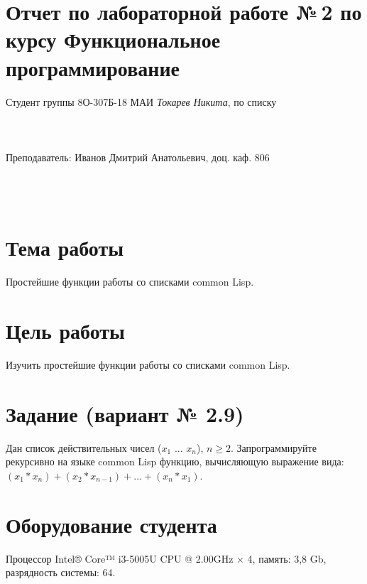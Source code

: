 \documentclass[12pt]{article}
\begin{document}
\section*{Отчет по лабораторной работе №\,2 
по курсу \guillemotleft  Функциональное программирование\guillemotright}
\begin{flushright}
Студент группы 8О-307Б-18 МАИ \textit{Токарев Никита},  по списку \\
 \\
 \\
\ \\
Преподаватель: Иванов Дмитрий Анатольевич, доц. каф. 806 \\
 \\
 \\
 \\

\end{flushright}

\section{Тема работы}
Простейшие функции работы со списками common Lisp.

\section{Цель работы}
Изучить  простейшие функции работы со списками common Lisp.

\section{Задание (вариант № 2.9)}
Дан список действительных чисел ($x_{1}$ ... $x_{n}$), \(n \geqslant 2\).
Запрограммируйте рекурсивно на языке common Lisp функцию, вычисляющую выражение вида:\\

$(x_{1} * x_{n}) + (x_{2} * x_{n-1}) + ... + (x_{n} * x_{1})$.

\section{Оборудование студента}
Процессор Intel® Core™ i3-5005U CPU @ 2.00GHz × 4, память: 3,8 Gb, разрядность системы: 64.
\end{document}
